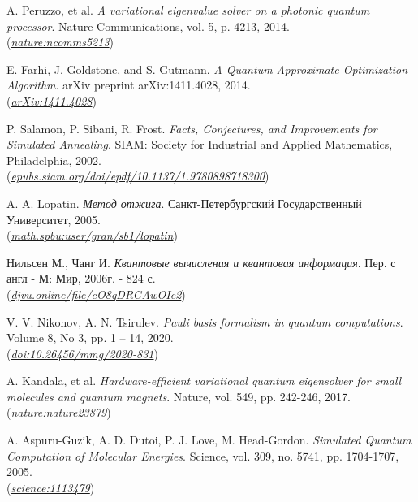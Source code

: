 \documentclass[a4paper]{report}
\begin{document}
\begin{thebibliography}{99}
    A. Peruzzo, et al. \textit{A variational eigenvalue solver on a photonic quantum processor}. Nature Communications, vol. 5, p. 4213, 2014.\\
    (\href{https://www.nature.com/articles/ncomms5213}{\textit{nature:ncomms5213}})

    E. Farhi, J. Goldstone, and S. Gutmann. \textit{A Quantum Approximate Optimization Algorithm}. arXiv preprint arXiv:1411.4028, 2014.\\
    (\href{https://arxiv.org/abs/1411.4028}{\textit{arXiv:1411.4028}})

    P. Salamon, P. Sibani, R. Frost. \textit{Facts, Conjectures, and Improvements for Simulated Annealing}. SIAM: Society for Industrial and Applied Mathematics, Philadelphia, 2002.\\
    (\href{https://epubs.siam.org/doi/epdf/10.1137/1.9780898718300.fm}{\textit{epubs.siam.org/doi/epdf/10.1137/1.9780898718300}})

    A. A. Lopatin. \textit{Метод отжига}. Санкт-Петербургский Государственный Университет, 2005.\\
    (\href{https://math.spbu.ru/user/gran/sb1/lopatin.pdf}{\textit{math.spbu:user/gran/sb1/lopatin}})

    Нильсен М., Чанг И. \textit{Квантовые вычисления и квантовая информация}. Пер. с англ - М: Мир, 2006г. - 824 с.\\
    (\href{https://djvu.online/file/cO8qDRGAwOIe2}{\textit{djvu.online/file/cO8qDRGAwOIe2}})

    V. V. Nikonov, A. N. Tsirulev. \textit{Pauli basis formalism in quantum computations}. Volume 8, No 3, pp. 1 – 14, 2020.\\
    (\href{https:doi.org/10.26456/mmg/2020-831} {\textit{doi:10.26456/mmg/2020-831}})

    A. Kandala, et al. \textit{Hardware-efficient variational quantum eigensolver for small molecules and quantum magnets}. Nature, vol. 549, pp. 242-246, 2017.\\
    (\href{https://www.nature.com/articles/nature23879}{\textit{nature:nature23879}})

    A. Aspuru-Guzik, A. D. Dutoi, P. J. Love, M. Head-Gordon. \textit{Simulated Quantum Computation of Molecular Energies}. Science, vol. 309, no. 5741, pp. 1704-1707, 2005.\\
    (\href{https://www.science.org/doi/10.1126/science.1113479}{\textit{science:1113479}})


\end{thebibliography}
\end{document}
